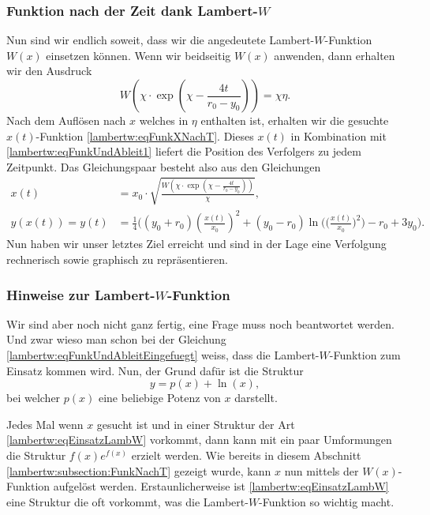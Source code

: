 \subsubsection{Funktion nach der Zeit dank Lambert-\(W\)
	\label{lambertw:subsubsection:LambertWundFvonT}}
Nun sind wir endlich soweit, dass wir die angedeutete Lambert-\(W\)-Funktion \(W(x)\) einsetzen können. Wenn wir beidseitig \(W(x)\) anwenden, dann erhalten wir den Ausdruck
\begin{equation}
	W\left(\chi\cdot \operatorname{exp}\left(\displaystyle \chi-\frac{4t}{r_0-y_0}\right)\right)
	=
	\chi\eta.
\end{equation}
Nach dem Auflösen nach \(x\) welches in \(\eta\) enthalten ist, erhalten wir die gesuchte \(x(t)\)-Funktion \eqref{lambertw:eqFunkXNachT}. Dieses \(x(t)\) in Kombination mit \eqref{lambertw:eqFunkUndAbleit1} liefert die Position des Verfolgers zu jedem Zeitpunkt. Das Gleichungspaar besteht also aus den Gleichungen
\begin{subequations}
	\label{lambertw:eqFunktionenNachT}
	\begin{align}
		\label{lambertw:eqFunkXNachT}
		x(t)
		&=
		x_0\cdot\sqrt{\frac{W\left(\chi\cdot \operatorname{exp}\left(\displaystyle \chi-\frac{4t}{r_0-y_0}\right)\right)}{\chi}}, \\
		\label{lambertw:eqFunkYNachT}
		y(x(t))
		=
		y(t)
		&=
		\frac{1}{4}\biggl(\left(y_0+r_0\right)\left(\frac{x(t)}{x_0}\right)^2+\left(y_0-r_0\right)\operatorname{ln}\biggl(\biggl(\frac{x(t)}{x_0}\biggr)^2\biggr)-r_0+3y_0\biggr).
	\end{align}
\end{subequations}
Nun haben wir unser letztes Ziel erreicht und sind in der Lage eine Verfolgung rechnerisch sowie graphisch zu repräsentieren.

\subsubsection{Hinweise zur Lambert-\(W\)-Funktion
	\label{lambertw:subsubsection:HinwLambertW}}
Wir sind aber noch nicht ganz fertig, eine Frage muss noch beantwortet werden. Und zwar wieso man schon bei der Gleichung \eqref{lambertw:eqFunkUndAbleitEingefuegt} weiss, dass die Lambert-\(W\)-Funktion zum Einsatz kommen wird.
Nun, der Grund dafür ist die Struktur
\begin{equation}
	y
	=
	p(x) +\operatorname{ln}(x),
	\label{lambertw:eqEinsatzLambW}
\end{equation}
bei welcher \(p(x)\) eine beliebige Potenz von \(x\) darstellt. 

Jedes Mal wenn \(x\) gesucht ist und in einer Struktur der Art \eqref{lambertw:eqEinsatzLambW} vorkommt, dann kann mit ein paar Umformungen die Struktur \(f(x)e^{f(x)}\) erzielt werden. Wie bereits in diesem Abschnitt \ref{lambertw:subsection:FunkNachT} gezeigt wurde, kann \(x\) nun mittels der \(W(x)\)-Funktion aufgelöst werden. Erstaunlicherweise ist \eqref{lambertw:eqEinsatzLambW} eine Struktur die oft vorkommt, was die Lambert-\(W\)-Funktion so wichtig macht.   